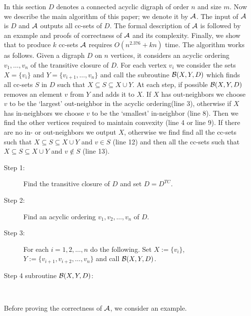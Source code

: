 \documentclass[11pt]{article}
\newcommand{\2}{\vspace{0.2 cm}}
\begin{document}
In this section $D$ denotes a connected acyclic digraph of order $n$
and size $m$. Now we describe the main algorithm of this paper; we
denote it by ${\cal A}$. The input of ${\cal A}$ is $D$ and ${\cal
A}$ outputs all cc-sets of $D$. The formal description of ${\cal A}$
is followed by an example and proofs of correctness of ${\cal A}$
and its complexity. Finally, we show that to produce $k$ cc-sets
$\cal A$ requires $O(n^{2.376}+kn)$ time. The algorithm works as follows. 
Given a digraph
$D$ on $n$ vertices, it considers an acyclic ordering $v_1,\ldots,v_n$ of the
transitive closure of $D$.
For each vertex $v_i$ we consider the sets $X=\{v_i\}$ and $Y=\{v_{i+1},\ldots ,
v_{n}\}$ and call the subroutine ${\cal B}(X,Y,D)$ which finds all cc-sets $S$ in
$D$ such
that $X \subseteq S \subseteq X \cup Y$.
At each step, if possible ${\cal B}(X,Y,D)$ removes an element $v$ from $Y$ and adds
it to $X$. If $X$ has out-neighbors we choose $v$ to be the
`largest' out-neighbor in the acyclic ordering(line 3), otherwise if $X$ has
in-neighbors
we choose $v$ to be the `smallest' in-neighbor (line 8).  Then we
find the other vertices required to maintain convexity (line 4 or
line 9). If there are no in- or out-neighbors we output $X$,
otherwise we find find all the cc-sets such that $X\subseteq
S\subseteq X\cup Y$ and $v\in S$ (line 12) and then all the cc-sets
such that $X\subseteq S\subseteq X\cup Y$ and $v\not\in S$ (line
13). 


\begin{description}
  \item[Step 1:] Find the transitive closure of $D$ and
  set $D =D^{TC}.$
  \item[Step 2:] Find an acyclic ordering $v_1,v_2,\ldots,v_n$ of
  $D$.
  \item[Step 3:] For each $i=1,2,\ldots,n$ do the following.  Set $X:=\{v_i\}$,
$Y:=\{v_{i+1},v_{i+2}, \ldots, v_{n} \}$ and call ${\cal B}(X,Y,D)$.

\item[Step 4 subroutine ${\cal B}(X,Y,D)$:]\mbox{}\\
{ \obeylines{}}
\end{description}
Before proving the correctness of $\cal A$, we consider an example.
\end{document}
